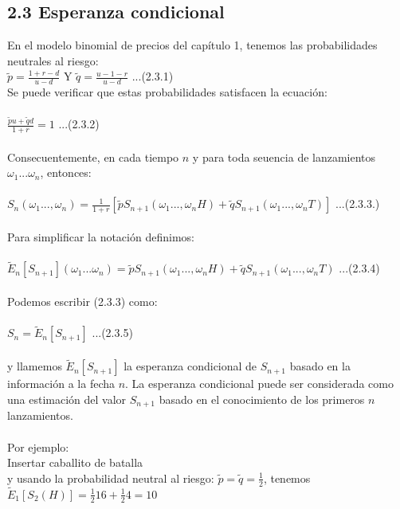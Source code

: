 \documentclass{article}
\begin{document}
        \subsection{2.3 Esperanza condicional}
        En el modelo binomial de precios del capítulo 1, tenemos las probabilidades neutrales al riesgo:
        \\
        $\tilde{p} = \frac{1+r-d}{u-d}$ Y $\tilde{q} = \frac{u-1-r}{u-d}$ ...(2.3.1)
        \\
        Se puede verificar que estas probabilidades satisfacen la ecuación:
        \\
        \\
        $\frac{\tilde{p}u + \tilde{q}d}{1+r} = 1$ ...(2.3.2)
        \\
        \\
        Consecuentemente, en cada tiempo $n$ y para toda seuencia de lanzamientos $\omega_1 ... \omega_n$, entonces:
        \\
        \\
        $S_n(\omega_1 ..., \omega_n) = \frac{1}{1+r} [\tilde{p} S_{n+1}(\omega_1...,\omega_nH) + \tilde{q} S_{n+1}(\omega_1...,\omega_nT)]$ ...(2.3.3.)
        \\
        \\
        Para simplificar la notación definimos:
        \\
        \\
        $\tilde{E}_n [S_{n+1}](\omega_1...\omega_n) = \tilde{p} S_{n+1}(\omega_1...,\omega_nH) + \tilde{q} S_{n+1}(\omega_1...,\omega_nT)$ ...(2.3.4)
        \\
        \\
        Podemos escribir (2.3.3) como:
        \\
        \\
        $S_n = \tilde{E}_n[S_{n+1}]$ ...(2.3.5)
        \\
        \\y llamemos $\tilde{E}_n[S_{n+1}]$ la esperanza condicional de $S_{n+1}$ basado en la información a la fecha $n$.
        La esperanza condicional puede ser considerada como una estimación del valor $S_{n+1}$ basado en el conocimiento de los primeros $n$ lanzamientos.
        \\
        \\
        Por ejemplo:
        \\
        Insertar caballito de batalla
        \\
        y usando la probabilidad neutral al riesgo:
        $\tilde{p} = \tilde{q} = \frac{1}{2}$, tenemos $\tilde{E}_1[S_2(H)] = \frac{1}{2} 16 + \frac{1}{2} 4 = 10$
\end{document}
